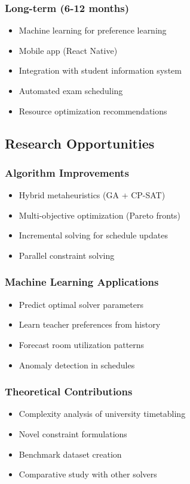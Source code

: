 \documentclass[12pt,a4paper]{article}
\begin{document}
\subsubsection{Long-term (6-12 months)}
\begin{itemize}
    \item Machine learning for preference learning
    \item Mobile app (React Native)
    \item Integration with student information system
    \item Automated exam scheduling
    \item Resource optimization recommendations
\end{itemize}


\subsection{Research Opportunities}

\subsubsection{Algorithm Improvements}
\begin{itemize}
    \item Hybrid metaheuristics (GA + CP-SAT)
    \item Multi-objective optimization (Pareto fronts)
    \item Incremental solving for schedule updates
    \item Parallel constraint solving
\end{itemize}

\subsubsection{Machine Learning Applications}
\begin{itemize}
    \item Predict optimal solver parameters
    \item Learn teacher preferences from history
    \item Forecast room utilization patterns
    \item Anomaly detection in schedules
\end{itemize}

\subsubsection{Theoretical Contributions}
\begin{itemize}
    \item Complexity analysis of university timetabling
    \item Novel constraint formulations
    \item Benchmark dataset creation
    \item Comparative study with other solvers
\end{itemize}
\end{document}
